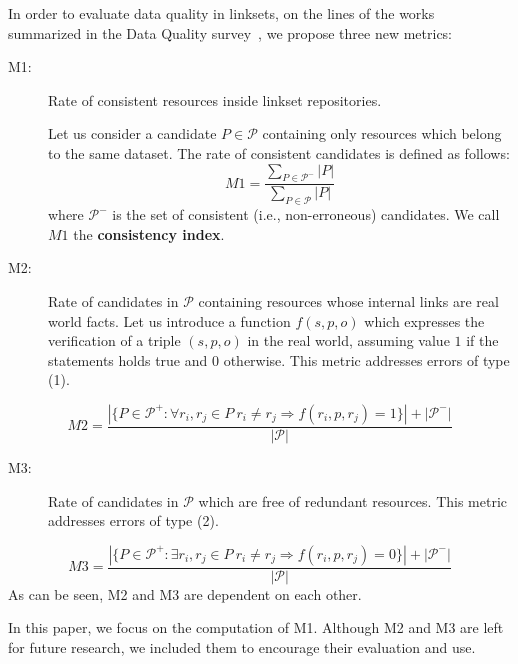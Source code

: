 In order to evaluate data quality in linksets, on the lines of the works summarized in the Data Quality survey~\cite{zaveri2015quality}, we propose three new metrics:
\begin{description}
\item[M1:] Rate of consistent resources inside linkset repositories.

Let us consider a candidate $P \in \mathcal{P}$ containing only resources which belong to the same dataset. The rate of consistent candidates is defined as follows:
\begin{equation} \label{eqn:m1}
M1=\frac{ \sum_{P \in \mathcal{P}^-} |P|}{ \sum_{P \in \mathcal{P}} |P|}
\end{equation}
where $\mathcal{P}^-$ is the set of consistent (i.e., non-erroneous) candidates. We call $M1$ the \textbf{consistency index}.
\item[M2:] Rate of candidates in $\mathcal{P}$ containing resources whose internal links are real world facts. Let us introduce a function $f(s,p,o)$ which expresses the verification of a triple $(s,p,o)$ in the real world, assuming value $1$ if the statements holds true and $0$ otherwise. This metric addresses errors of type (1).
\end{description}
%
\begin{equation}
M2= \frac{ | \{ P \in \mathcal{P}^+ : \forall r_i, r_j \in P \ r_i \neq r_j \Rightarrow f(r_i, p, r_j) = 1 \} | + |\mathcal{P}^-| }{ |\mathcal{P}|  }
\end{equation}
%
\begin{description}
\item[M3:] Rate of candidates in $\mathcal{P}$ which are free of redundant resources. This metric addresses errors of type (2).
\end{description}
%
\begin{equation}
M3= \frac{ | \{ P \in \mathcal{P}^+ : \exists r_i, r_j \in P \ r_i \neq r_j \Rightarrow f(r_i, p, r_j) = 0 \} | + |\mathcal{P}^-| }{ |\mathcal{P}|  }
\end{equation}
%
As can be seen, M2 and M3 are dependent on each other.

In this paper, we focus on the computation of M1. 
Although M2 and M3 are left for future research, we included them to encourage their evaluation and use.

